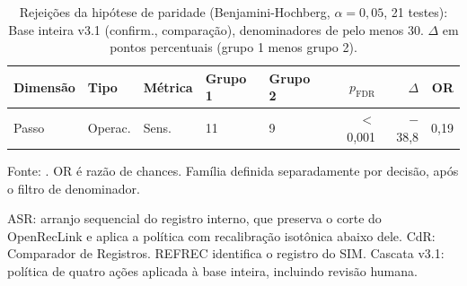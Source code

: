 \begin{table}[htbp]
\centering
\caption{Rejei\c{c}\~oes da hip\'otese de paridade (Benjamini-Hochberg, $\alpha = 0{,}05$, 21 testes): Base inteira v3.1 (confirm., comparação), denominadores de pelo menos 30. $\Delta$ em pontos percentuais (grupo 1 menos grupo 2).}
\label{tab:equidade-den30-cascata-v31-confirmacao}
\small
\begin{tabular}{lllllrrr}
\toprule
Dimens\~ao & Tipo & M\'etrica & Grupo 1 & Grupo 2 & $p_{\mathrm{FDR}}$ & $\Delta$ & OR \\
\midrule
Passo & Operac. & Sens. & 11 & 9 & $<$0{,}001 & $-$38{,}8 & 0{,}19 \\
\bottomrule
\end{tabular}
\par\footnotesize Fonte: . OR é razão de chances. Família definida separadamente por decisão, após o filtro de denominador.
\par\footnotesize ASR: arranjo sequencial do registro interno, que preserva o corte do OpenRecLink e aplica a política com recalibração isotônica abaixo dele. CdR: Comparador de Registros. REFREC identifica o registro do SIM. Cascata v3.1: política de quatro ações aplicada à base inteira, incluindo revisão humana.
\end{table}
